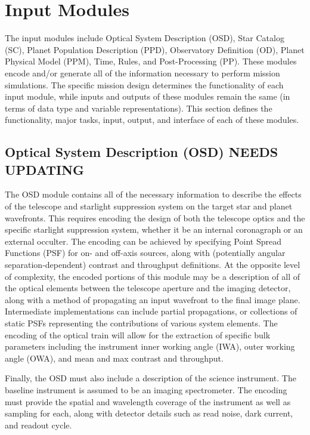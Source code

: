 \documentclass[cleanfoot]{asme2ej}
\begin{document}
\section{Input Modules}\label{sec:modules}
The input modules include Optical System Description (OSD), Star Catalog (SC), Planet Population Description (PPD), Observatory Definition (OD), Planet Physical Model (PPM), Time, Rules, and Post-Processing (PP).  These modules encode and/or generate all of the information necessary to perform mission simulations.  The specific mission design determines the functionality of each input module, while inputs and outputs of these modules remain the same (in terms of data type and variable representations).  This section defines the functionality, major tasks, input, output, and interface of each of these modules.


\subsection{Optical System Description (OSD) NEEDS UPDATING}
The OSD module contains all of the necessary information to describe the effects of the telescope and starlight suppression system on the target star and planet wavefronts.  This requires encoding the design of both the telescope optics and the specific starlight suppression system, whether it be an internal coronagraph or an external occulter.  The encoding can be achieved by specifying Point Spread Functions (PSF) for on- and off-axis sources, along with (potentially angular separation-dependent) contrast and throughput definitions.  At the opposite level of complexity, the encoded portions of this module may be a description of all of the optical elements between the telescope aperture and the imaging detector, along with a method of propagating an input wavefront to the final image plane.  Intermediate implementations can include partial propagations, or collections of static PSFs representing the contributions of various system elements.  The encoding of the optical train will allow for the extraction of specific bulk parameters including the instrument inner working angle (IWA), outer working angle (OWA), and mean and max contrast and throughput.

Finally, the OSD must also include a description of the science instrument.  The baseline instrument is assumed to be an imaging spectrometer.  The encoding must provide the spatial and wavelength coverage of the instrument as well as sampling for each, along with detector details such as read noise, dark current, and readout cycle.
\end{document}
